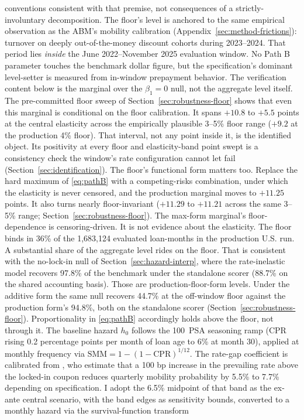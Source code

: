 \documentclass[12pt]{article}
\begin{document}
conventions consistent with that premise, not consequences of a strictly-involuntary decomposition. The floor's level is anchored to the same empirical observation as the ABM's mobility calibration (Appendix~\ref{sec:method-frictions}): turnover on deeply out-of-the-money discount cohorts during 2023--2024. That period lies \emph{inside} the June 2022--November 2025 evaluation window. No Path B parameter touches the benchmark dollar figure, but the specification's dominant level-setter is measured from in-window prepayment behavior. The verification content below is the marginal over the $\beta_1 = 0$ null, not the aggregate level itself. The pre-committed floor sweep of Section~\ref{sec:robustness-floor} shows that even this marginal is conditional on the floor calibration. It spans $+10.8$ to $+5.5$ points at the central elasticity across the empirically plausible 3--5\% floor range ($+9.2$ at the production 4\% floor). That interval, not any point inside it, is the identified object. Its positivity at every floor and elasticity-band point swept is a consistency check the window's rate configuration cannot let fail (Section~\ref{sec:identification}). The floor's functional form matters too. Replace the hard maximum of \eqref{eq:pathB} with a competing-risks combination, under which the elasticity is never censored, and the production marginal moves to $+11.25$ points. It also turns nearly floor-invariant ($+11.29$ to $+11.21$ across the same 3--5\% range; Section~\ref{sec:robustness-floor}). The max-form marginal's floor-dependence is censoring-driven. It is not evidence about the elasticity. The floor binds in 36\% of the 1,683,124 evaluated loan-months in the production U.S. run. A substantial share of the aggregate level rides on the floor. That is consistent with the no-lock-in null of Section~\ref{sec:hazard-interp}, where the rate-inelastic model recovers 97.8\% of the benchmark under the standalone scorer (88.7\% on the shared accounting basis). Those are production-floor-form levels. Under the additive form the same null recovers 44.7\% at the off-window floor against the production form's 94.8\%, both on the standalone scorer (Section~\ref{sec:robustness-floor}). Proportionality in \eqref{eq:pathB} accordingly holds above the floor, not through it. The baseline hazard $h_0$ follows the 100~PSA seasoning ramp (CPR rising 0.2 percentage points per month of loan age to 6\% at month 30), applied at monthly frequency via $\mathrm{SMM} = 1-(1-\mathrm{CPR})^{1/12}$. The rate-gap coefficient is calibrated from \citet{liebersohn2024}, who estimate that a 100 bp increase in the prevailing rate above the locked-in coupon reduces quarterly mobility probability by 5.5\% to 7.7\% depending on specification. I adopt the 6.5\% midpoint of that band as the ex-ante central scenario, with the band edges as sensitivity bounds, converted to a monthly hazard via the survival-function transform
\end{document}
